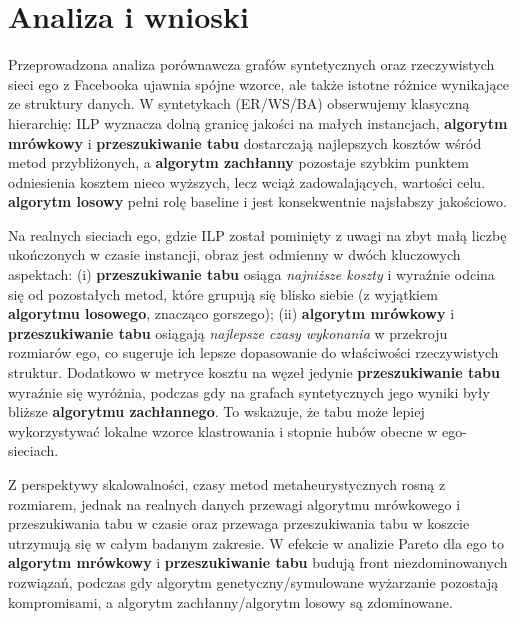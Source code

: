 \section{Analiza i wnioski}

Przeprowadzona analiza porównawcza grafów syntetycznych oraz rzeczywistych sieci ego z Facebooka ujawnia spójne wzorce, ale także istotne różnice wynikające ze struktury danych. W syntetykach (ER/WS/BA) obserwujemy klasyczną hierarchię: ILP wyznacza dolną granicę jakości na małych instancjach, \textbf{algorytm mrówkowy} i \textbf{przeszukiwanie tabu} dostarczają najlepszych kosztów wśród metod przybliżonych, a \textbf{algorytm zachłanny} pozostaje szybkim punktem odniesienia kosztem nieco wyższych, lecz wciąż zadowalających, wartości celu. \textbf{algorytm losowy} pełni rolę baseline i jest konsekwentnie najsłabszy jakościowo.

Na realnych sieciach ego, gdzie ILP został pominięty z uwagi na zbyt małą liczbę ukończonych w czasie instancji, obraz jest odmienny w dwóch kluczowych aspektach: (i) \textbf{przeszukiwanie tabu} osiąga \emph{najniższe koszty} i wyraźnie odcina się od pozostałych metod, które grupują się blisko siebie (z wyjątkiem \textbf{algorytmu losowego}, znacząco gorszego); (ii) \textbf{algorytm mrówkowy} i \textbf{przeszukiwanie tabu} osiągają \emph{najlepsze czasy wykonania} w przekroju rozmiarów ego, co sugeruje ich lepsze dopasowanie do właściwości rzeczywistych struktur. Dodatkowo w metryce kosztu na węzeł jedynie \textbf{przeszukiwanie tabu} wyraźnie się wyróżnia, podczas gdy na grafach syntetycznych jego wyniki były bliższe \textbf{algorytmu zachłannego}. To wskazuje, że tabu może lepiej wykorzystywać lokalne wzorce klastrowania i stopnie hubów obecne w ego-sieciach.

Z perspektywy skalowalności, czasy metod metaheurystycznych rosną z rozmiarem, jednak na realnych danych przewagi algorytmu mrówkowego i przeszukiwania tabu w czasie oraz przewaga przeszukiwania tabu w koszcie utrzymują się w całym badanym zakresie. W efekcie w analizie Pareto dla ego to \textbf{algorytm mrówkowy} i \textbf{przeszukiwanie tabu} budują front niezdominowanych rozwiązań, podczas gdy algorytm genetyczny/symulowane wyżarzanie pozostają kompromisami, a algorytm zachłanny/algorytm losowy są zdominowane.

